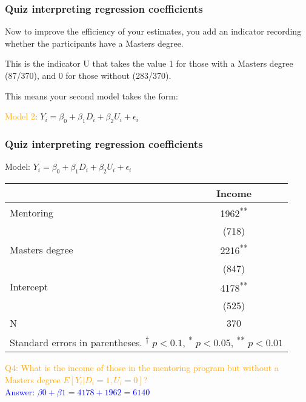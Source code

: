 \documentclass[12pt,english,dvipsnames,aspectratio=169,handout]{beamer}\usepackage[]{graphicx}\usepackage[]{xcolor}
\begin{document}
\begin{frame}
	\frametitle{Quiz interpreting regression coefficients}
\footnotesize

Now to improve the efficiency of your estimates, you add an indicator recording whether the participants have a Masters degree. 

This is the indicator U that takes the value 1 for those with a Masters degree (87/370), and 0 for those without (283/370).

This means your second model takes the form:

\normalsize\vspace{3mm}
\textcolor{orange}{Model 2}: ${Y}_i = \beta_0 + \beta_1 D_i + \beta_2 U_i + \epsilon_i$
\footnotesize

\vspace{25mm}

\end{frame}



\begin{frame}
	\frametitle{Quiz interpreting regression coefficients}
\centering
\tiny
Model: ${Y}_i = \beta_0 + \beta_1 D_i + \beta_2 U_i + \epsilon_i$

\scriptsize
\centering
\begin{tabular}{l*{1}{c}}
\toprule
          &\multicolumn{1}{c}{Income}\\
\midrule
Mentoring     &     1962\textsuperscript{**}\\
          &    (718)        \\
Masters degree    &     2216\textsuperscript{**}\\
          &    (847)        \\
Intercept    &     4178\textsuperscript{**}\\
          &    (525)        \\
\midrule
N         &      370        \\
\bottomrule
\multicolumn{2}{l}{Standard errors in parentheses. \textsuperscript{†} \(p<0.1\), \textsuperscript{*} \(p<0.05\), \textsuperscript{**} \(p<0.01\)}\\
\end{tabular}
\footnotesize\flushleft

\textcolor{orange}{Q4: What is the income of those in the mentoring program but without a Masters degree $E[Y_i|D_i=1,U_i=0]$?}\\
\textcolor{blue}{Answer: $\beta0 + \beta1 = 4178+1962 = 6140$}

\end{frame}
\end{document}
